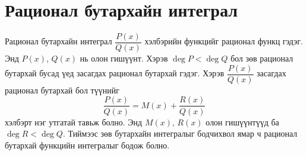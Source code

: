 

\section{Рационал бутархайн интеграл}
\begin{frame}[allowframebreaks]{Рационал бутархайн интеграл}
$\dfrac{P(x)}{Q(x)}$ хэлбэрийн функцийг рационал функц гэдэг. Энд $P(x)$, $Q(x)$ нь олон гишүүнт. Хэрэв  $\deg P<\deg Q$ бол зөв рационал бутархай бусад үед засагдах рационал бутархай гэдэг. Хэрэв $\dfrac{P(x)}{Q(x)}$ засагдах рационал бутархай бол түүнийг 
$$\dfrac{P(x)}{Q(x)}=M(x)+\dfrac{R(x)}{Q(x)}$$ хэлбэрт нэг утгатай тавьж болно. Энд $M(x),\, R(x)$  олон гишүүнтүүд ба $\deg R<\deg Q$. Тиймээс зөв бутархайн интегралыг бодчихвол ямар ч рационал бутархай функцийн интегралыг бодож болно. 
\end{frame}

